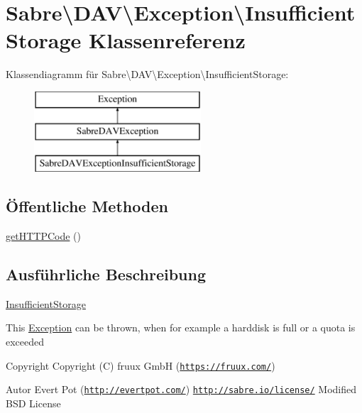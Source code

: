 \hypertarget{class_sabre_1_1_d_a_v_1_1_exception_1_1_insufficient_storage}{}\section{Sabre\textbackslash{}D\+AV\textbackslash{}Exception\textbackslash{}Insufficient\+Storage Klassenreferenz}
\label{class_sabre_1_1_d_a_v_1_1_exception_1_1_insufficient_storage}
Klassendiagramm für Sabre\textbackslash{}D\+AV\textbackslash{}Exception\textbackslash{}Insufficient\+Storage\+:\begin{figure}[H]
\begin{center}
\leavevmode
\includegraphics[height=3.000000cm]{class_sabre_1_1_d_a_v_1_1_exception_1_1_insufficient_storage}
\end{center}
\end{figure}
\subsection*{Öffentliche Methoden}
\begin{DoxyCompactItemize}
\item 
\mbox{\hyperlink{class_sabre_1_1_d_a_v_1_1_exception_1_1_insufficient_storage_a98b241f1a1ba5d5fbda41e1284cd069d}{get\+H\+T\+T\+P\+Code}} ()
\end{DoxyCompactItemize}


\subsection{Ausführliche Beschreibung}
\mbox{\hyperlink{class_sabre_1_1_d_a_v_1_1_exception_1_1_insufficient_storage}{Insufficient\+Storage}}

This \mbox{\hyperlink{class_sabre_1_1_d_a_v_1_1_exception}{Exception}} can be thrown, when for example a harddisk is full or a quota is exceeded

\begin{DoxyCopyright}{Copyright}
Copyright (C) fruux GmbH (\href{https://fruux.com/}{\tt https\+://fruux.\+com/}) 
\end{DoxyCopyright}
\begin{DoxyAuthor}{Autor}
Evert Pot (\href{http://evertpot.com/}{\tt http\+://evertpot.\+com/})  \href{http://sabre.io/license/}{\tt http\+://sabre.\+io/license/} Modified B\+SD License 
\end{DoxyAuthor}



